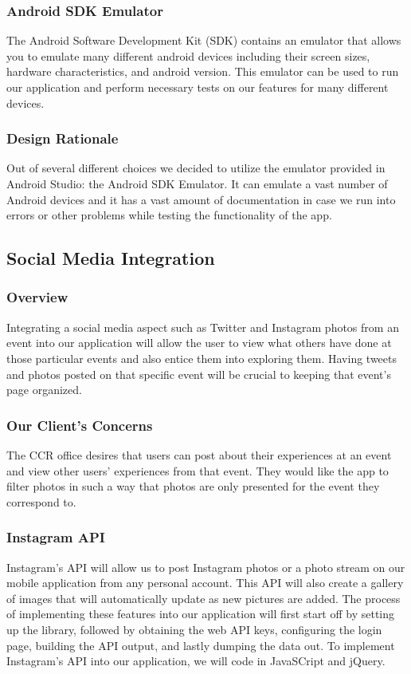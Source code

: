\documentclass[draftclsnofoot, onecolumn, 10pt, compsoc]{IEEEtran}
\begin{document}
			\subsubsection{Android SDK Emulator}
				The Android Software Development Kit (SDK) contains an emulator that allows you to emulate many different android devices including their screen sizes, hardware characteristics, and android version. This emulator can be used to run our application and perform necessary tests on our features for many different devices.
				~\cite{Android_SDK_Emulator}
			\subsubsection{Design Rationale}
				Out of several different choices we decided to utilize the emulator provided in Android Studio: the Android SDK Emulator. It can emulate a vast number of Android devices and it has a vast amount of documentation in case we run into errors or other problems while testing the functionality of the app.
				~\cite{Android_SDK_Emulator}
		\subsection{Social Media Integration}
			\subsubsection{Overview}
				Integrating a social media aspect such as Twitter and Instagram photos from an event into our application will allow the user to view what others have done at those particular events and also entice them into exploring them. Having tweets and photos posted on that specific event will be crucial to keeping that event's page organized.
			\subsubsection{Our Client's Concerns}
				The CCR office desires that users can post about their experiences at an event and view other users' experiences from that event. They would like the app to filter photos in such a way that photos are only presented for the event they correspond to.
			\subsubsection{Instagram API}
				Instagram's API will allow us to post Instagram photos or a photo stream on our mobile application from any personal account. This API will also create a gallery of images that will automatically update as new pictures are added. The process of implementing these features into our application will first start off by setting up the library, followed by obtaining the web API keys, configuring the login page, building the API output, and lastly dumping the data out. To implement Instagram's API into our application, we will code in JavaSCript and jQuery.
				~\cite{InstaAPI}
\end{document}
